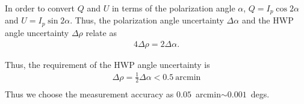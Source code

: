 \documentclass[11pt]{amsart}
\newcommand\ben{\begin{eqnarray}}
\newcommand\een{\end{eqnarray}}
\begin{document}
In order to convert $Q$ and $U$ in terms of the polarization angle $\alpha$, $Q=I_p \cos{2\alpha}$ and $U=I_p \sin{2\alpha}$.
Thus, the polarization angle uncertainty $\Delta\alpha$ and the HWP angle uncertainty $\Delta\rho$ relate as
\ben
	4\Delta\rho = 2\Delta\alpha.
\een

Thus, the requirement of the HWP angle uncertainty is 
\ben
	\Delta\rho = \frac{1}{2} \Delta\alpha < 0.5 \  \mbox{arcmin} \\
\een
Thus we choose the measurement accuracy as $0.05$~arcmin$ \sim 0.001$~degs.
\end{document}
